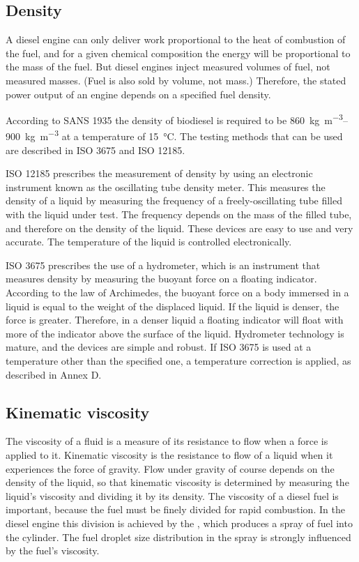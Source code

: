 \subsection{Density}

A diesel engine can only deliver work proportional to the heat of combustion of
the fuel, and for a given chemical composition the energy will be proportional
to the mass of the fuel. But diesel engines inject measured volumes of fuel, not
measured masses. (Fuel is also sold by volume, not mass.) Therefore, the stated
power output of an engine depends on a specified fuel density.

According to SANS 1935 the density of biodiesel is required to be
\SIrange{860}{900}{\kilogram\per\cubic\metre} at a temperature of
\SI{15}{\celsius}. The testing methods that can be used are described in ISO
3675 and ISO 12185.

ISO 12185 prescribes the measurement of density by using an electronic
instrument known as the oscillating tube density meter. This measures the
density of a liquid by measuring the frequency of a freely-oscillating tube
filled with the liquid under test. The frequency depends on the mass of the
filled tube, and therefore on the density of the liquid.
These devices are easy to use and very accurate. The temperature of the liquid
is controlled electronically.

ISO 3675 prescribes the use of a hydrometer, which is an instrument that
measures density by measuring the buoyant force on a floating indicator.
According to the law of Archimedes, the buoyant force on a body immersed in a
liquid is equal to the weight of the displaced liquid. If the liquid is denser,
the force is greater. Therefore, in a denser liquid a floating indicator will
float with more of the indicator above the surface of the liquid. Hydrometer
technology is mature, and the devices are simple and robust.  If ISO 3675 is
used at a temperature other than the specified one, a temperature correction is
applied, as described in Annex D.

\subsection{Kinematic viscosity}

The viscosity of a fluid is a measure of its resistance to flow when a force is
applied to it. Kinematic viscosity is the resistance to flow of a liquid when it
experiences the force of gravity. Flow under gravity of course depends on the
density of the liquid, so that kinematic viscosity is determined by measuring
the liquid's viscosity and dividing it by its density. The viscosity of a diesel
fuel is important, because the fuel must be finely divided for rapid combustion.
In the diesel engine this division is achieved by the , which
produces a spray of fuel into the cylinder. The fuel droplet size distribution
in the spray is strongly influenced by the fuel's viscosity.

